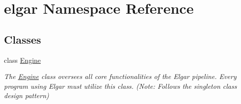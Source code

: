 \hypertarget{namespaceelgar}{}\section{elgar Namespace Reference}
\label{namespaceelgar}
\subsection*{Classes}
\begin{DoxyCompactItemize}
\item 
class \hyperlink{classelgar_1_1Engine}{Engine}
\begin{DoxyCompactList}\small\item\em The \hyperlink{classelgar_1_1Engine}{Engine} class oversees all core functionalities of the Elgar pipeline. Every program using Elgar must utilize this class. (Note\+: Follows the singleton class design pattern) \end{DoxyCompactList}\end{DoxyCompactItemize}
